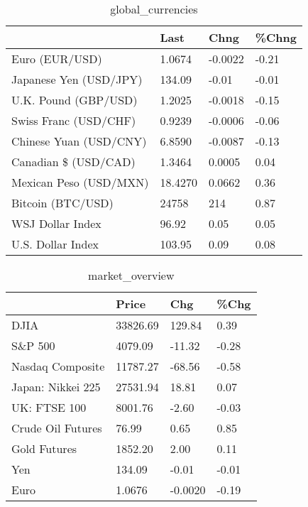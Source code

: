 \documentclass{article}%
\begin{document}
%


\begin{table}[htbp]%
\caption{global\_currencies}%
\centering%
\begin{adjustbox}{width=1\textwidth}%
\begin{tabular}{llll}
\toprule
                       &    Last &    Chng & \%Chng \\
\midrule
        Euro (EUR/USD) &  1.0674 & -0.0022 & -0.21 \\
Japanese Yen (USD/JPY) &  134.09 &   -0.01 & -0.01 \\
  U.K. Pound (GBP/USD) &  1.2025 & -0.0018 & -0.15 \\
 Swiss Franc (USD/CHF) &  0.9239 & -0.0006 & -0.06 \\
Chinese Yuan (USD/CNY) &  6.8590 & -0.0087 & -0.13 \\
  Canadian \$ (USD/CAD) &  1.3464 &  0.0005 &  0.04 \\
Mexican Peso (USD/MXN) & 18.4270 &  0.0662 &  0.36 \\
     Bitcoin (BTC/USD) &   24758 &     214 &  0.87 \\
      WSJ Dollar Index &   96.92 &    0.05 &  0.05 \\
     U.S. Dollar Index &  103.95 &    0.09 &  0.08 \\
\bottomrule
\end{tabular}
%
\end{adjustbox}%
\end{table}

%


\begin{table}[htbp]%
\caption{market\_overview}%
\centering%
\begin{adjustbox}{width=1\textwidth}%
\begin{tabular}{llll}
\toprule
                  &    Price &     Chg &  \%Chg \\
\midrule
             DJIA & 33826.69 &  129.84 &  0.39 \\
          S\&P 500 &  4079.09 &  -11.32 & -0.28 \\
 Nasdaq Composite & 11787.27 &  -68.56 & -0.58 \\
Japan: Nikkei 225 & 27531.94 &   18.81 &  0.07 \\
     UK: FTSE 100 &  8001.76 &   -2.60 & -0.03 \\
Crude Oil Futures &    76.99 &    0.65 &  0.85 \\
     Gold Futures &  1852.20 &    2.00 &  0.11 \\
              Yen &   134.09 &   -0.01 & -0.01 \\
             Euro &   1.0676 & -0.0020 & -0.19 \\
\bottomrule
\end{tabular}
%
\end{adjustbox}%
\end{table}

%
\end{document}
